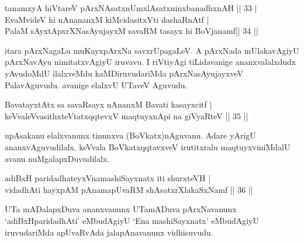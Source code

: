
\begin{shl}
\footnotemark[2]tanamxyA hiVtareV pArxNAsatxnUmxlAsatxninxbanadhxnAH \hfill|| 33 | \\
EvaMvideV hi nAnananxM kiMcidasitxVti dashaRnAtf | \\
PalaM sAyxtApxrXNasAyujayxM savaRM tasayx hi BoVjanamf\hfill|| 34 || 
\end{shl}

\begin{artha}
itara pArxNagaLu muKayxpArxNa savxrUpagaLeV. A pArxNada mUlakavAgiyU pArxNavAyu nimitatxvAgiyU iruvavu. I riVtiyAgi tiLidavanige ananxvalalxdudx yAvudoMdU ilalxveMdu kaMDiruvudariMda pArxNasAyujayxveV PalavAguvudu. avanige elalxvU UTaveV Aguvudu.
\end{artha}


\begin{shl}
BavatayxtAtx sa savaRsayx nAnanxM Bavati kasayxcitf | \\
keVvaleV\s vasithxteV\s tatxqqtevxV maqtuyxnA\s pi na giVyaRteV \hfill|| 35 || 
\end{shl}

\begin{artha}
upAsakanu elalxvanunx tinunxva (BoVkatx)nAguvanu. Adare yArigU ananxvAguvudilalx. keVvala BoVkatxqqtavxveV irutitxralu maqtuyxviniMdalU avanu nuMgalapxDuvudilalx.
\end{artha}


\begin{shl}
adiBxH paridadhateyxVnamashiSayxnatx iti shurxteVH | \\
vidadhAti hayxpAM pAnamapUvaRM shAsatxrXlakaSxNamf \hfill|| 36 || 
\end{shl}

\begin{artha}
UTa mADalapxDuva ananxvanunx UTamADuva pArxNavanunx `adiBxHparidadhAti' eMbudAgiyU `Ena mashiSayxnatx' eMbudAgiyU iruvudariMda apUvaRvAda jalapAnavanunx vidhisuvudu.
\end{artha}

